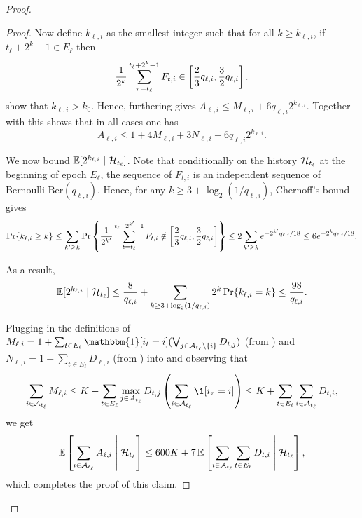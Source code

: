 \begin{proof}
\begin{proof}
Now define $k_{\ell,i}$ as the smallest integer such that for all $k\geq k_{\ell,i}$, if $t_\ell+2^k-1\in E_\ell$ then
\begin{equation}\label{eq:def_k_il}
    \frac{1}{2^k}\sum_{\tau=t_\ell}^{t_\ell+2^k-1} F_{t,i} \in \left[ \frac{2}{3}q_{\ell,i}, \frac{3}{2}q_{\ell,i}  \right].
\end{equation}
 show that $k_{\ell,i}>k_0$. Hence, furthering  gives $A_{\ell,i} \leq M_{\ell,i} + 6 q_{\ell,i} 2^{k_{\ell,i}}$.
Together with  this shows that in all cases one has
\begin{equation}\label{eq:full_case}
    A_{\ell,i} \leq 1 + 4M_{\ell,i} + 3N_{\ell,i} + 6 q_{\ell,i} 2^{k_{\ell,i}}.
\end{equation}





We now bound $\E[2^{k_{\ell,i}}\mid\mH_{t_\ell}]$.
Note that conditionally on the history $\mathcal{H}_{t_\ell}$ at the beginning of epoch $E_\ell$, the sequence of $F_{t,i}$ is an independent sequence of Bernoulli $\text{Ber}(q_{\ell,i})$. Hence, for any $k\geq 3+\log_2(1/q_{\ell,i})$, Chernoff's bound gives
\begin{equation*}
    \Pr\{k_{\ell,i} \geq k\} \leq \sum_{k'\geq k}\Pr\left \{\frac{1}{2^{k'}}\sum_{t=t_\ell}^{t_\ell+2^{k'}-1} F_{t,i} \notin \left[ \frac{2}{3}q_{\ell,i},\frac{3}{2}q_{\ell,i} \right]\right \} \leq 2\sum_{k'\geq k}e^{-2^{k'}q_{\ell,i}/18} \leq 6e^{-2^{k}q_{\ell,i}/18}.
\end{equation*}

As a result,
\begin{equation*}
    \E[2^{k_{\ell,i}}\mid\mH_{t_\ell}] \leq \frac{8}{q_{\ell,i}} + \sum_{k\geq 3+\log_2(1/q_{\ell,i})}2^k \Pr \{k_{\ell,i} = k\} \leq \frac{98}{q_{\ell,i}}.
\end{equation*}

Plugging in the definitions of $M_{\ell,i}=1+\sum_{t\in E_\ell}\mathbbm{1}[i_t=i] (\bigvee_{j\in \mA_{t_\ell}\setminus \{i\}} D_{t,j})$ (from ) and $N_{\ell,i}=1+\sum_{t\in E_\ell} D_{\ell,i}$ (from ) into  and observing that
\begin{equation}\label{eq:useful_inequality}
    \sum_{i\in \mA_{t_\ell}} M_{\ell,i} \leq K + \sum_{t\in E_\ell} \max_{j\in\mA_{t_\ell}} D_{t,j}\paren{ \sum_{i\in \mA_{t_\ell}} \1[i_{\tau}=i] } \leq K+\sum_{t\in E_\ell} \sum_{i\in \mA_{t_\ell}} D_{t,i},
\end{equation}
we get
\begin{equation*}
    \E\sqb{\sum_{i\in\mA_{t_\ell}} A_{\ell,i} \middle \vert \mH_{t_\ell}} \leq 600 K + 7 \E\sqb{\sum_{i\in \mA_{t_\ell}}\sum_{t\in E_\ell} D_{t,i} \middle \vert \mH_{t_\ell}},
\end{equation*}
which completes the proof of this claim.
\end{proof}


\end{proof}
